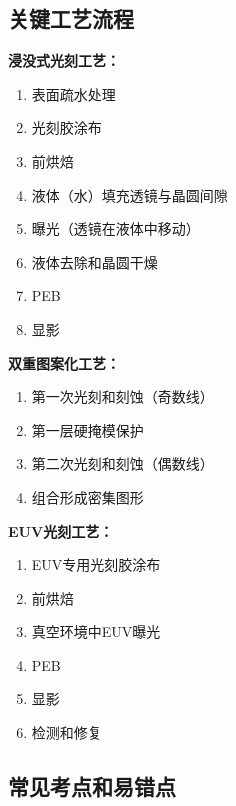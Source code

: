 \documentclass[UTF8,12pt,a4paper]{ctexart}
\begin{document}
\subsection{关键工艺流程}

\textbf{浸没式光刻工艺：}
\begin{enumerate}
    \item 表面疏水处理
    \item 光刻胶涂布
    \item 前烘焙
    \item 液体（水）填充透镜与晶圆间隙
    \item 曝光（透镜在液体中移动）
    \item 液体去除和晶圆干燥
    \item PEB
    \item 显影
\end{enumerate}

\textbf{双重图案化工艺：}
\begin{enumerate}
    \item 第一次光刻和刻蚀（奇数线）
    \item 第一层硬掩模保护
    \item 第二次光刻和刻蚀（偶数线）
    \item 组合形成密集图形
\end{enumerate}

\textbf{EUV光刻工艺：}
\begin{enumerate}
    \item EUV专用光刻胶涂布
    \item 前烘焙
    \item 真空环境中EUV曝光
    \item PEB
    \item 显影
    \item 检测和修复
\end{enumerate}

\subsection{常见考点和易错点}
\end{document}
